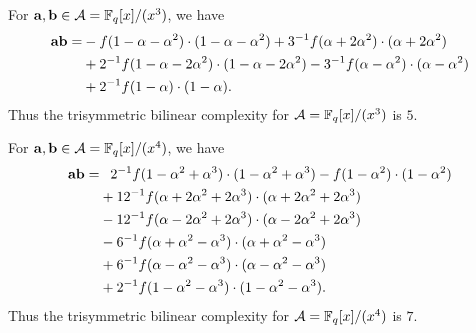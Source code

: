 \documentclass[a4paper,11pt]{article}
\begin{document}
For $\mathbf{a}, \mathbf{b}\in\mathcal{A}=\mathbb{F}_{q}[x]/(x^3)$, we have
\begin{equation*}
  \begin{split}
  \mathbf{a}\mathbf{b} =&
  -f(1-\alpha-\alpha^2)\cdot(1-\alpha-\alpha^2)+3^{-1}f(\alpha+2\alpha^2)\cdot(\alpha+2\alpha^2)\\
  &+2^{-1}f(1-\alpha-2\alpha^2)\cdot(1-\alpha-2\alpha^2) -
  3^{-1}f(\alpha-\alpha^2)\cdot(\alpha-\alpha^2)\\
  &+2^{-1}f(1-\alpha)\cdot(1-\alpha).
  \end{split}
\end{equation*}
Thus the trisymmetric bilinear complexity for $\mathcal{A}=\mathbb{F}_q[x]/(x^3)$ is $5$.

For $\mathbf{a}, \mathbf{b}\in\mathcal{A}=\mathbb{F}_{q}[x]/(x^4)$, we have
\begin{equation*}
  \begin{split}
    \mathbf{a}\mathbf{b} =&\phantom{+}2^{-1}f(1-\alpha^2+\alpha^3)\cdot(1-\alpha^2+\alpha^3)-f(1-\alpha^2)\cdot(1-\alpha^2)\\
  &+12^{-1}f(\alpha+2\alpha^2+2\alpha^3)\cdot(\alpha+2\alpha^2+2\alpha^3)\\
  &-12^{-1}f(\alpha-2\alpha^2+2\alpha^3)\cdot(\alpha-2\alpha^2+2\alpha^3)\\
  &-6^{-1}f(\alpha+\alpha^2-\alpha^3)\cdot(\alpha+\alpha^2-\alpha^3)\\
  &+6^{-1}f(\alpha-\alpha^2-\alpha^3)\cdot(\alpha-\alpha^2-\alpha^3)\\
  &+2^{-1}f(1-\alpha^2-\alpha^3)\cdot(1-\alpha^2-\alpha^3).
  \end{split}
\end{equation*}
Thus the trisymmetric bilinear complexity for $\mathcal{A}=\mathbb{F}_q[x]/(x^4)$ is $7$.



\end{document}
